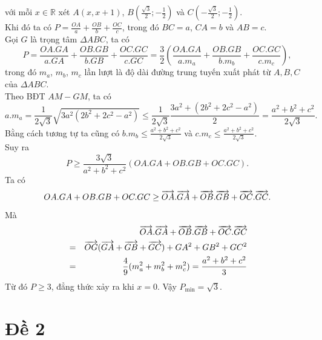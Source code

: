 \hda 
\bd với mỗi $x\in\mathbb{R}$ xét $A(x,x+1)$, $B\left(\frac{\sqrt 3}2;-\frac 12\right)$ và $C\left(-\frac{\sqrt 3}2;-\frac 12\right)$.\\
Khi đó ta có $P=\frac{OA}a+\frac{OB}b+\frac{OC}c$, trong đó $BC=a$, $CA=b$ và $AB=c$.\\
Gọi $G$ là trọng tâm $\Delta ABC$, ta có
$$ P=\frac{OA.GA}{a.GA}+\frac{OB.GB}{b.GB}+\frac{OC.GC}{c.GC}=\frac 32\left(\frac{OA.GA}{a.m_a}+\frac{OB.GB}{b.m_b}+\frac{OC.GC}{c.m_c}\right), $$
trong đó $m_a$, $m_b$, $m_c$ lần lượt là độ dài đường trung tuyến xuất phát từ $A,B,C$ của $\Delta ABC$.\\
Theo BĐT $AM-GM$, ta có
$$ a.m_a=\frac 1{2\sqrt 3}\sqrt{3a^2(2b^2+2c^2-a^2)}\le \frac 1{2\sqrt 3}\frac{3a^2+(2b^2+2c^2-a^2)}2=\frac{a^2+b^2+c^2}{2\sqrt 3}. $$
Bằng cách tương tự ta cũng có $b.m_b\le \frac{a^2+b^2+c^2}{2\sqrt 3}$ và $c.m_c\le \frac{a^2+b^2+c^2}{2\sqrt 3}$.\\
Suy ra $$P\ge \frac{3\sqrt 3}{a^2+b^2+c^2}(OA.GA+OB.GB+OC.GC).$$
Ta có $$OA.GA+OB.GB+OC.GC\ge \overrightarrow{OA}.\overrightarrow{GA}+\overrightarrow{OB}.\overrightarrow{GB}+\overrightarrow{OC}.\overrightarrow{GC}.$$
Mà
\begin{eqnarray*}
&&\overrightarrow{OA}.\overrightarrow{GA}+\overrightarrow{OB}.\overrightarrow{GB}+\overrightarrow{OC}.\overrightarrow{GC}\\
&=&\overrightarrow{OG}(\overrightarrow{GA}+\overrightarrow{GB}+\overrightarrow{GC})+GA^2+GB^2+GC^2\\
&=&\frac 49(m_a^2+m_b^2+m_c^2)=\frac{a^2+b^2+c^2}3
\end{eqnarray*}
Từ đó $P\ge 3$, đẳng thức xảy ra khi $x=0$. Vậy $P_{\min}=\sqrt 3$.
\section{Đề 2}

